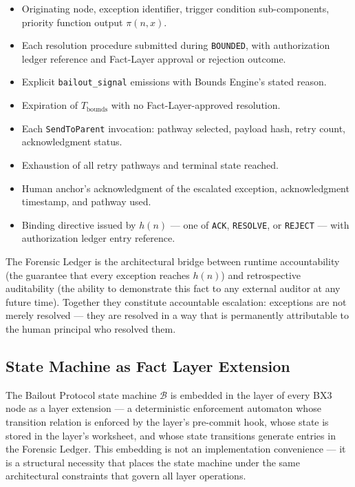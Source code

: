 \begin{itemize}\itemsep=0pt
\item[\texttt{bailout-trigger}] Originating node, exception identifier, trigger condition sub-components, priority function output $\pi(n, x)$.
\item[\texttt{bounds-resolution-attempt}] Each resolution procedure submitted during \texttt{BOUNDED}, with authorization ledger reference and Fact-Layer approval or rejection outcome.
\item[\texttt{bailout-signal}] Explicit \texttt{bailout\_signal} emissions with Bounds Engine's stated reason.
\item[\texttt{timeout-bounds-expired}] Expiration of $T_{\text{bounds}}$ with no Fact-Layer-approved resolution.
\item[\texttt{escalation-sent}] Each \texttt{SendToParent} invocation: pathway selected, payload hash, retry count, acknowledgment status.
\item[\texttt{pathway-exhausted}] Exhaustion of all retry pathways and terminal state reached.
\item[\texttt{human-ack}] Human anchor's acknowledgment of the escalated exception, acknowledgment timestamp, and pathway used.
\item[\texttt{human-directive}] Binding directive issued by $h(n)$ — one of \texttt{ACK}, \texttt{RESOLVE}, or \texttt{REJECT} — with authorization ledger entry reference.
\end{itemize}

The Forensic Ledger is the architectural bridge between runtime accountability (the guarantee that every exception reaches $h(n)$) and retrospective auditability (the ability to demonstrate this fact to any external auditor at any future time). Together they constitute accountable escalation: exceptions are not merely resolved — they are resolved in a way that is permanently attributable to the human principal who resolved them.

\subsection{State Machine as Fact Layer Extension}
\label{sec:bailout-fsm-extension}

The Bailout Protocol state machine $\mathcal{B}$ is embedded in the \fact{} layer of every BX3 node as a \fact{} layer extension — a deterministic enforcement automaton whose transition relation is enforced by the \fact{} layer's pre-commit hook, whose state is stored in the \fact{} layer's worksheet, and whose state transitions generate entries in the Forensic Ledger. This embedding is not an implementation convenience — it is a structural necessity that places the state machine under the same architectural constraints that govern all \fact{} layer operations.

